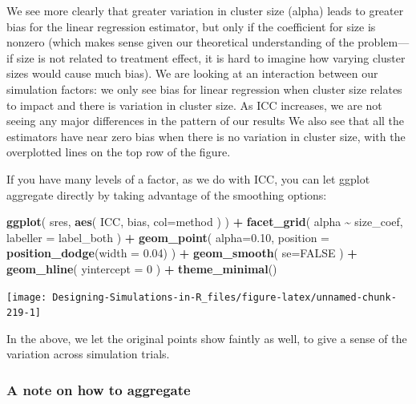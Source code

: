 \documentclass[
]{book}
\newenvironment{Shaded}{\begin{snugshade}}{\end{snugshade}}
\newcommand{\AttributeTok}[1]{\textcolor[rgb]{0.13,0.29,0.53}{#1}}
\newcommand{\ConstantTok}[1]{\textcolor[rgb]{0.56,0.35,0.01}{#1}}
\newcommand{\DecValTok}[1]{\textcolor[rgb]{0.00,0.00,0.81}{#1}}
\newcommand{\FloatTok}[1]{\textcolor[rgb]{0.00,0.00,0.81}{#1}}
\newcommand{\FunctionTok}[1]{\textcolor[rgb]{0.13,0.29,0.53}{\textbf{#1}}}
\newcommand{\NormalTok}[1]{#1}
\newcommand{\SpecialCharTok}[1]{\textcolor[rgb]{0.81,0.36,0.00}{\textbf{#1}}}
\begin{document}
We see more clearly that greater variation in cluster size (alpha) leads to greater bias for the linear regression estimator, but only if the coefficient for size is nonzero (which makes sense given our theoretical understanding of the problem---if size is not related to treatment effect, it is hard to imagine how varying cluster sizes would cause much bias).
We are looking at an interaction between our simulation factors: we only see bias for linear regression when cluster size relates to impact and there is variation in cluster size.
As ICC increases, we are not seeing any major differences in the pattern of our results
We also see that all the estimators have near zero bias when there is no variation in cluster size, with the overplotted lines on the top row of the figure.

If you have many levels of a factor, as we do with ICC, you can let ggplot aggregate directly by taking advantage of the smoothing options:

\begin{Shaded}
\begin{Highlighting}[]
\FunctionTok{ggplot}\NormalTok{( sres, }\FunctionTok{aes}\NormalTok{( ICC, bias, }\AttributeTok{col=}\NormalTok{method ) ) }\SpecialCharTok{+}
  \FunctionTok{facet\_grid}\NormalTok{( alpha }\SpecialCharTok{\textasciitilde{}}\NormalTok{  size\_coef, }\AttributeTok{labeller =}\NormalTok{ label\_both ) }\SpecialCharTok{+}
  \FunctionTok{geom\_point}\NormalTok{( }\AttributeTok{alpha=}\FloatTok{0.10}\NormalTok{,}
              \AttributeTok{position =} \FunctionTok{position\_dodge}\NormalTok{(}\AttributeTok{width =} \FloatTok{0.04}\NormalTok{) ) }\SpecialCharTok{+}
  \FunctionTok{geom\_smooth}\NormalTok{( }\AttributeTok{se=}\ConstantTok{FALSE}\NormalTok{ ) }\SpecialCharTok{+} 
  \FunctionTok{geom\_hline}\NormalTok{( }\AttributeTok{yintercept =} \DecValTok{0}\NormalTok{ ) }\SpecialCharTok{+}
  \FunctionTok{theme\_minimal}\NormalTok{()}
\end{Highlighting}
\end{Shaded}

\begin{center}\texttt{[image: Designing-Simulations-in-R\_files/figure-latex/unnamed-chunk-219-1]} \end{center}

In the above, we let the original points show faintly as well, to give a sense of the variation across simulation trials.

\subsubsection{A note on how to aggregate}\label{a-note-on-how-to-aggregate}
\end{document}
